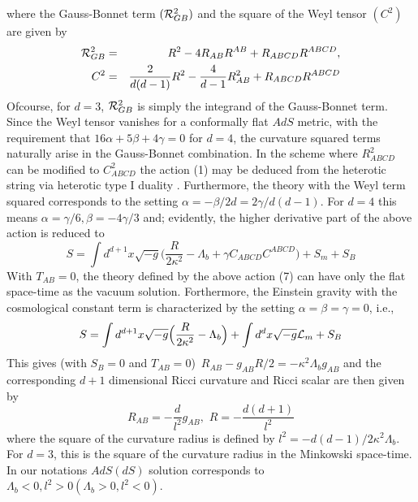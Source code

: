 \documentclass[a4paper,12pt]{article}
\newcommand {\nn} {\nonumber}
\begin{document}
where the Gauss-Bonnet term $({\cal R}_{GB}^2)$ and the square of the 
Weyl tensor $(C^2)$ are given by
\begin{eqnarray}
{\cal R}_{GB}^2 &=& R^2-4R_{AB}R^{AB}+R_{ABCD}R^{ABCD},\nn\\
C^2 &=&\frac{2}{d(d-1)}R^2-\frac{4}{d-1}R_{AB}^2+R_{ABCD}R^{ABCD}
\end{eqnarray}
Ofcourse, for $d=3$, ${\cal R}_{GB}^2$ is simply the integrand of the Gauss-Bonnet term.
Since the Weyl tensor vanishes for a conformally flat $AdS$ metric, with the 
requirement that $16\alpha+5\beta+4\gamma=0$ for $d=4$, the curvature 
squared terms naturally arise in the Gauss-Bonnet combination. 
In the scheme where $R_{ABCD}^2$ can be modified to $C_{ABCD}^2$ the 
action (1) may be deduced from the heterotic string via heterotic type
 I duality \cite{AAT,ESF}. Furthermore, the theory with the Weyl term squared 
corresponds to the setting $\alpha=-\beta/{2d}=2\gamma/{d(d-1)}$. 
For $d=4$ this means $\alpha=\gamma/6,\beta=
-4\gamma/3$ and; evidently, the higher derivative part of the 
above action is reduced to
\begin{equation}
S=\int d^{d+1}x \sqrt{-g}\Big(\frac{R}{2\kappa^2} -\Lambda_b+\gamma
 C_{ABCD} C^{ABCD}\Big)+S_m+S_B
\end{equation}
With $T_{AB}=0$, the theory defined by the above action (7) can have 
only the flat 
space-time as the vacuum solution. Forthermore, the 
 Einstein gravity with the cosmological constant term is characterized 
by the setting $\alpha=\beta=\gamma=0$, i.e.,
\begin{equation}
S=\int d^{d+1}x\sqrt{-g}\Big(\frac{R}{2\kappa^2}-\Lambda_b\Big)
+\int d^dx\sqrt{-g}{\cal L}_m+S_B
\end{equation}
This gives (with $S_B=0$ and $T_{AB}=0$)~$R_{AB}-g_{AB}R/2=
-\kappa^2 \Lambda_b g_{AB}$ and the corresponding $d+1$ dimensional Ricci 
curvature and Ricci scalar are then given by
\begin{equation}
R_{AB}= -\frac{d}{l^2}g_{AB},\,\, R=-\frac{d(d+1)}{l^2}
\end{equation}
where the square of the curvature radius is defined by 
$l^2=-d(d-1)/2\kappa^2 \Lambda_b$. For $d=3$, this is the square 
of the curvature radius in the Minkowski space-time. In our notations 
$AdS(dS)$ solution corresponds to $\Lambda_b<0, l^2>0 (\Lambda_b>0, l^2<0)$.
\end{document}
